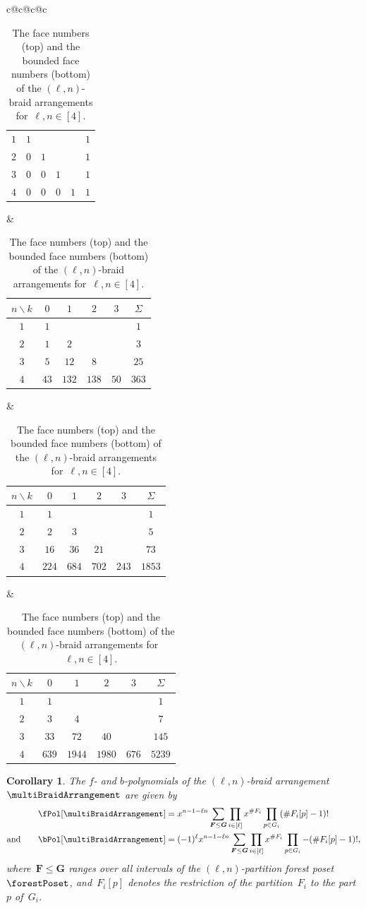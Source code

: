 \documentclass{amsart}
\newtheorem{corollary}[theorem]{Corollary}
\theoremstyle{definition}
\renewcommand{\b}[1]{{\boldsymbol{#1}}} %
\newcommand{\card}[1]{\##1} %
\renewcommand{\b}[1]{\boldsymbol{#1}} %
\begin{document}
\begin{table}[t]
{{\begin{tabular}{c@{\hspace{.7cm}}c@{\hspace{.7cm}}c@{\hspace{.7cm}}c}
\begin{tabular}[t]{c|cccc|c}
				\hline
				$1$ & $1$ &&&& $1$ \\
				$2$ & $0$ & $1$ &&& $1$ \\
				$3$ & $0$ & $0$ & $1$ && $1$ \\
				$4$ & $0$ & $0$ & $0$ & $1$ & $1$
			\end{tabular}
			&
			\begin{tabular}[t]{c|cccc|c}
				$n \backslash k$ & $0$ & $1$ & $2$ & $3$ & $\Sigma$ \\
				\hline
				$1$ & $1$ &&&& $1$ \\
				$2$ & $1$ & $2$ &&& $3$ \\
				$3$ & $5$ & $12$ & $8$ && $25$ \\
				$4$ & $43$ & $132$ & $138$ & $50$ & $363$
			\end{tabular}
			&
			\begin{tabular}[t]{c|cccc|c}
				$n \backslash k$ & $0$ & $1$ & $2$ & $3$ & $\Sigma$ \\
				\hline
				$1$ & $1$ &&&& $1$ \\
				$2$ & $2$ & $3$ &&& $5$ \\
				$3$ & $16$ & $36$ & $21$ && $73$ \\
				$4$ & $224$ & $684$ & $702$ & $243$ & $1853$
			\end{tabular}
			&
			\begin{tabular}[t]{c|cccc|c}
				$n \backslash k$ & $0$ & $1$ & $2$ & $3$ & $\Sigma$ \\
				\hline
				$1$ & $1$ &&&& $1$ \\
				$2$ & $3$ & $4$ &&& $7$ \\
				$3$ & $33$ & $72$ & $40$ && $145$ \\
				$4$ & $639$ & $1944$ & $1980$ & $676$ & $5239$
			\end{tabular}
		\end{tabular}
	}}
	\caption{The face numbers (top) and the bounded face numbers (bottom) of the $(\ell,n)$-braid arrangements for~$\ell, n \in [4]$.}
	\label{table:fvectorMultiBraidArrangements}
\end{table}

\begin{corollary}
\label{coro:fbvectorsMultiBraidArrangement}
The $f$- and $b$-polynomials of the $(\ell,n)$-braid arrangement~$\multiBraidArrangement$ are given by
\begin{align*}
\fPol[\multiBraidArrangement] & = x^{n-1-\ell n}\sum_{\b{F} \le \b{G}} \prod_{i \in [\ell]} x^{\card{F_i}} \prod_{p \in G_i} (\card{F_i[p]}-1)!\\
\text{and}\qquad
\bPol[\multiBraidArrangement] & = (-1)^\ell x^{n-1-\ell n} \sum_{\b{F} \le \b{G}} \prod_{i \in [\ell]} x^{\card{F_i}} \prod_{p \in G_i} -(\card{F_i[p]}-1)! ,
\end{align*}
where~$\b{F} \le \b{G}$ ranges over all intervals of the $(\ell,n)$-partition forest poset~$\forestPoset$, and~$F_i[p]$ denotes the restriction of the partition~$F_i$ to the part~$p$ of~$G_i$.
\end{corollary}
\end{document}
